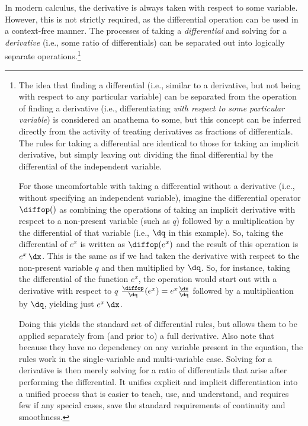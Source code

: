 In modern calculus, the derivative is always taken with respect to some variable.
However, this is not strictly required, as the differential operation can be used in a context-free manner.
The processes of taking a \emph{differential} and solving for a \emph{derivative} (i.e., some ratio of differentials) can be separated out into logically separate operations.\footnote{The 
  idea that finding a differential (i.e., similar to a derivative, but not being with respect to any particular variable) 
  can be separated from the operation of finding a derivative (i.e., differentiating \emph{with respect to some particular variable}) 
  is considered an anathema to some, but this concept can be inferred directly from the activity of treating derivatives as fractions of differentials.  
  The rules for taking a differential are identical to those for taking an implicit derivative, but simply leaving out dividing the final differential by the differential of the independent variable.

  For those uncomfortable with taking a differential without a derivative (i.e., without specifying an independent variable), imagine the differential operator $\diffop()$ as combining the operations of taking an implicit derivative with respect to a non-present variable (such as $q$) followed by a multiplication by the differential of that variable (i.e., $\dq$ in this example).  
  So, taking the differential of $e^x$ is written as $\diffop(e^x)$ and the result of this operation is $e^x\,\dx$.  
  This is the same as if we had taken the derivative with respect to the non-present variable $q$ and then multiplied by $\dq$.  
  So, for instance, taking the differential of the function $e^x$, the operation would start out with a derivative with respect to $q$ $\frac{\diffop}{\dq}(e^x) = e^x \frac{\dx}{\dq}$ followed by a multiplication by $\dq$, yielding just $e^x\,\dx$.  

  Doing this yields the standard set of differential rules, but allows them to be applied separately from (and prior to) a full derivative.  
  Also note that because they have no dependency on any variable present in the equation, the rules work in the single-variable and multi-variable case.  
  Solving for a derivative is then merely solving for a ratio of differentials that arise after performing the differential.  
  It unifies explicit and implicit differentiation into a unified process that is easier to teach, use, and understand, and requires few if any special cases, save the standard requirements of continuity and smoothness.
}

